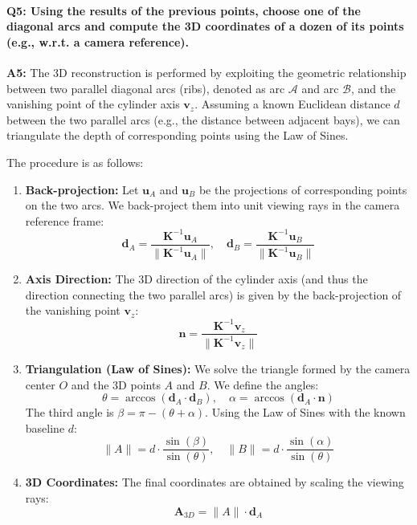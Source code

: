 \documentclass[a4paper,11pt]{article}
\newcommand{\matr}[1]{\bm{#1}}     %
\newcommand{\vect}[1]{\mathbf{#1}}  %
\begin{document}
\paragraph{Q5: Using the results of the previous points, choose one of the diagonal arcs and compute the 3D coordinates of a dozen of its points (e.g., w.r.t. a camera reference).}

\textbf{A5:} The 3D reconstruction is performed by exploiting the geometric relationship between two parallel diagonal arcs (ribs), denoted as arc $\mathcal{A}$ and arc $\mathcal{B}$, and the vanishing point of the cylinder axis $\vect{v}_z$.
Assuming a known Euclidean distance $d$ between the two parallel arcs (e.g., the distance between adjacent bays), we can triangulate the depth of corresponding points using the Law of Sines.

The procedure is as follows:
\begin{enumerate}
    \item \textbf{Back-projection:} Let $\vect{u}_A$ and $\vect{u}_B$ be the projections of corresponding points on the two arcs. We back-project them into unit viewing rays in the camera reference frame:
    \begin{equation}
        \vect{d}_A = \frac{\matr{K}^{-1}\vect{u}_A}{\|\matr{K}^{-1}\vect{u}_A\|}, \quad \vect{d}_B = \frac{\matr{K}^{-1}\vect{u}_B}{\|\matr{K}^{-1}\vect{u}_B\|}
    \end{equation}
    
    \item \textbf{Axis Direction:} The 3D direction of the cylinder axis (and thus the direction connecting the two parallel arcs) is given by the back-projection of the vanishing point $\vect{v}_z$:
    \begin{equation}
        \vect{n} = \frac{\matr{K}^{-1}\vect{v}_z}{\|\matr{K}^{-1}\vect{v}_z\|}
    \end{equation}
    
    \item \textbf{Triangulation (Law of Sines):} We solve the triangle formed by the camera center $O$ and the 3D points $A$ and $B$. We define the angles:
    \begin{equation}
        \theta = \arccos(\vect{d}_A \cdot \vect{d}_B), \quad \alpha = \arccos(\vect{d}_A \cdot \vect{n})
    \end{equation}
    The third angle is $\beta = \pi - (\theta + \alpha)$. Using the Law of Sines with the known baseline $d$:
    \begin{equation}
        \|A\| = d \cdot \frac{\sin(\beta)}{\sin(\theta)}, \quad \|B\| = d \cdot \frac{\sin(\alpha)}{\sin(\theta)}
    \end{equation}
    
    \item \textbf{3D Coordinates:} The final coordinates are obtained by scaling the viewing rays:
    \begin{equation}
        \vect{A}_{3D} = \|A\| \cdot \vect{d}_A
    \end{equation}
\end{enumerate}
\end{document}

